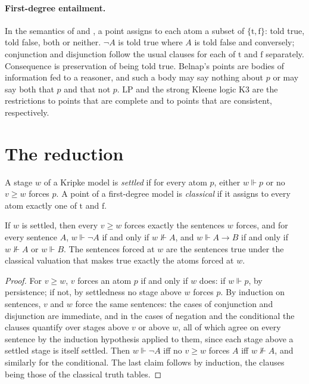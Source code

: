 \documentclass{situationist-preprint}
\begin{document}
\paragraph{First-degree entailment.} In the semantics of \citet{Dunn1976} and \citet{Belnap1977}, a point assigns to each atom a subset of $\{\mathrm{t}, \mathrm{f}\}$: told true, told false, both or neither. $\neg A$ is told true where $A$ is told false and conversely; conjunction and disjunction follow the usual clauses for each of $\mathrm{t}$ and $\mathrm{f}$ separately. Consequence is preservation of being told true. Belnap's points are bodies of information fed to a reasoner, and such a body may say nothing about $p$ or may say both that $p$ and that not $p$. LP and the strong Kleene logic K3 are the restrictions to points that are complete and to points that are consistent, respectively.

\section{The reduction}

\begin{definition}\label{d:settled}
A stage $w$ of a Kripke model is \emph{settled} if for every atom $p$, either $w \Vdash p$ or no $v \geq w$ forces $p$. A point of a first-degree model is \emph{classical} if it assigns to every atom exactly one of $\mathrm{t}$ and $\mathrm{f}$.
\end{definition}

\begin{proposition}\label{p:kripke}
If $w$ is settled, then every $v \geq w$ forces exactly the sentences $w$ forces, and for every sentence $A$, $w \Vdash \neg A$ if and only if $w \nVdash A$, and $w \Vdash A \to B$ if and only if $w \nVdash A$ or $w \Vdash B$. The sentences forced at $w$ are the sentences true under the classical valuation that makes true exactly the atoms forced at $w$.
\end{proposition}

\begin{proof}
For $v \geq w$, $v$ forces an atom $p$ if and only if $w$ does: if $w \Vdash p$, by persistence; if not, by settledness no stage above $w$ forces $p$. By induction on sentences, $v$ and $w$ force the same sentences: the cases of conjunction and disjunction are immediate, and in the cases of negation and the conditional the clauses quantify over stages above $v$ or above $w$, all of which agree on every sentence by the induction hypothesis applied to them, since each stage above a settled stage is itself settled. Then $w \Vdash \neg A$ iff no $v \geq w$ forces $A$ iff $w \nVdash A$, and similarly for the conditional. The last claim follows by induction, the clauses being those of the classical truth tables.
\end{proof}
\end{document}
